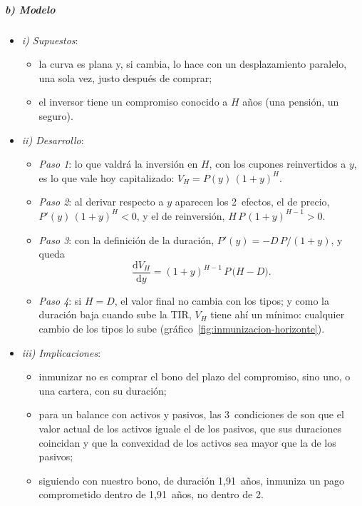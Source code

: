 \documentclass[11pt]{article}
\begin{document}
\subparagraph{b) Modelo}
\begin{itemize}
\item \emph{i) Supuestos}:
  \begin{itemize}
  \item la curva es plana y, si cambia, lo hace con un desplazamiento paralelo, una sola vez, justo después de comprar;
  \item el inversor tiene un compromiso conocido a $H$ años (una pensión, un seguro).
  \end{itemize}
\item \emph{ii) Desarrollo}:
  \begin{itemize}
  \item \emph{Paso 1}: lo que valdrá la inversión en $H$, con los cupones reinvertidos a $y$, es lo que vale hoy capitalizado: $V_H=P(y)\,(1+y)^H$.
  \item \emph{Paso 2}: al derivar respecto a $y$ aparecen los 2~efectos, el de precio, $P'(y)\,(1+y)^H<0$, y el de reinversión, $H\,P\,(1+y)^{H-1}>0$.
  \item \emph{Paso 3}: con la definición de la duración, $P'(y)=-D\,P/(1+y)$, y queda
    \[
    \frac{\mathrm{d}V_H}{\mathrm{d}y}=(1+y)^{H-1}\,P\,\big(H-D\big) .
    \]
  \item \emph{Paso 4}: si $H=D$, el valor final no cambia con los tipos; y como la duración baja cuando sube la TIR, $V_H$ tiene ahí un mínimo: cualquier cambio de los tipos lo sube (gráfico~\ref{fig:inmunizacion-horizonte}).
  \end{itemize}
\item \emph{iii) Implicaciones}:
  \begin{itemize}
  \item inmunizar no es comprar el bono del plazo del compromiso, sino uno, o una cartera, con su duración;
  \item para un balance con activos y pasivos, las 3~condiciones de  son que el valor actual de los activos iguale el de los pasivos, que sus duraciones coincidan y que la convexidad de los activos sea mayor que la de los pasivos;
  \item siguiendo con nuestro bono, de duración 1,91~años, inmuniza un pago comprometido dentro de 1,91~años, no dentro de 2.
  \end{itemize}
\end{itemize}
\end{document}
